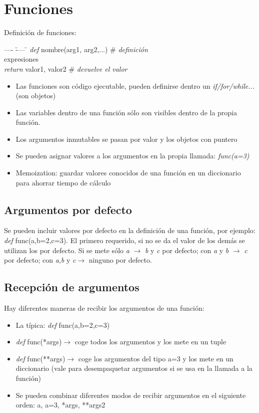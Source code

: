 \section{Funciones} \label{funciones}
	Definición de funciones:
	\begin{tabbing}
	---- \= ---- \= \kill
	\> \textit{def} nombre(arg1, arg2,...) \# \textit{definición} \\ 
	\>\> expresiones \\
	\>\> \textit{return} valor1, valor2 \#\textit{ devuelve el valor}
	\end{tabbing}
	\begin{itemize}
	\item Las funciones son código ejecutable, pueden definirse dentro un \textit{if/for/while...} (son objetos)
	\item Las variables dentro de una función sólo son visibles dentro de la propia función.
	\item Los argumentos inmutables se pasan por valor y los objetos con puntero
	\item Se pueden asignar valores a los argumentos en la propia llamada: \textit{func(a=3)}
	\item Memoization: guardar valores conocidos de una función en un diccionario para ahorrar tiempo de cálculo
	\end{itemize}

	\subsection{Argumentos por defecto} 
	\noindent Se pueden incluir valores por defecto en la definición de una función, por ejemplo: \textit{def} func(a,b=2,c=3). El primero requerido, si no se da el valor de los demás se utilizan los por defecto. Si se mete sólo \textit{a} $\rightarrow$ \textit{b} y \textit{c} por defecto; con \textit{a} y \textit{b} $\rightarrow$ \textit{c} por defecto; con \textit{a},\textit{b} y \textit{c}$\rightarrow$ ninguno por defecto. 

	\subsection{Recepción de argumentos}
	Hay diferentes maneras de recibir los argumentos de una función:
	\begin{itemize}
	\item La típica: \textit{def} func(a,b=2,c=3)
	\item \textit{def} func(*args)$\rightarrow$ coge todos los argumentos y los mete en un tuple
	\item \textit{def} func(**args)$\rightarrow$ coge los argumentos del tipo a=3 y los mete en un diccionario (vale para desempaquetar argumentos si se usa en la llamada a la función)
	\item Se pueden combinar diferentes modos de recibir argumentos en el siguiente orden: a, a=3, *args, **args2 
	\end{itemize} 

